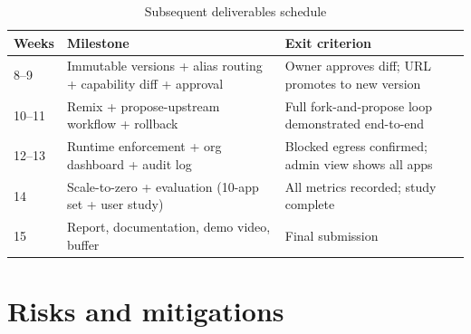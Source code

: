 \documentclass[11pt,a4paper]{article}
\begin{document}
\begin{table}[h]
\centering
\begin{tabular}{@{}p{1.8cm}p{5.8cm}p{5.6cm}@{}}
\toprule
\textbf{Weeks} & \textbf{Milestone} & \textbf{Exit criterion} \\
\midrule
8--9
  & Immutable versions + alias routing + capability diff + approval
  & Owner approves diff; URL promotes to new version \\
10--11
  & Remix + propose-upstream workflow + rollback
  & Full fork-and-propose loop demonstrated end-to-end \\
12--13
  & Runtime enforcement + org dashboard + audit log
  & Blocked egress confirmed; admin view shows all apps \\
14
  & Scale-to-zero + evaluation (10-app set + user study)
  & All metrics recorded; study complete \\
15
  & Report, documentation, demo video, buffer
  & Final submission \\
\bottomrule
\end{tabular}
\caption{Subsequent deliverables schedule}
\end{table}

\section{Risks and mitigations}
\end{document}
